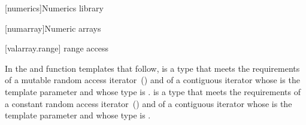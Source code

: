 
[numerics]{Numerics library}

\setcounter{section}{7}
[numarray]{Numeric arrays}


\setcounter{subsection}{9}
[valarray.range]{ range access}

\pnum
In the  and  function templates that follow, 
is a type that meets the requirements of a mutable random access
iterator~()
and of a contiguous iterator
whose  is the template
parameter  and whose  type is .  is a
type that meets the requirements of a constant random access
iterator~()
and of a contiguous iterator
whose  is the template
parameter  and whose  type is .

\pnum
[...]
